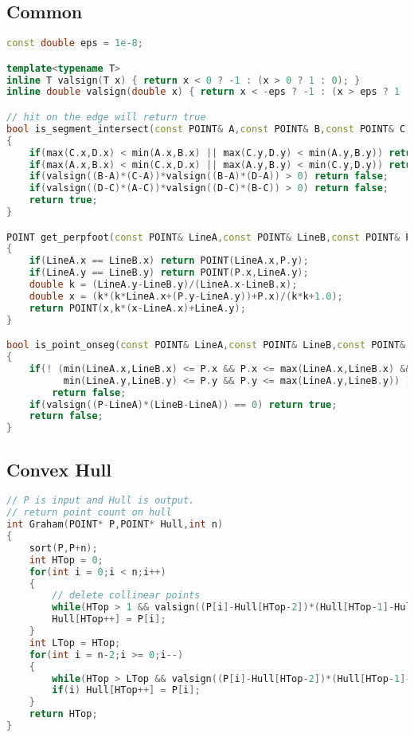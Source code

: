 \subsection{Common}
\begin{lstlisting}[language=C++]
const double eps = 1e-8;

template<typename T>
inline T valsign(T x) { return x < 0 ? -1 : (x > 0 ? 1 : 0); }
inline double valsign(double x) { return x < -eps ? -1 : (x > eps ? 1 : 0); }

// hit on the edge will return true
bool is_segment_intersect(const POINT& A,const POINT& B,const POINT& C,const POINT& D)
{
	if(max(C.x,D.x) < min(A.x,B.x) || max(C.y,D.y) < min(A.y,B.y)) return false;
	if(max(A.x,B.x) < min(C.x,D.x) || max(A.y,B.y) < min(C.y,D.y)) return false;
	if(valsign((B-A)*(C-A))*valsign((B-A)*(D-A)) > 0) return false;
	if(valsign((D-C)*(A-C))*valsign((D-C)*(B-C)) > 0) return false;
	return true;
}

POINT get_perpfoot(const POINT& LineA,const POINT& LineB,const POINT& P)
{
	if(LineA.x == LineB.x) return POINT(LineA.x,P.y);
	if(LineA.y == LineB.y) return POINT(P.x,LineA.y);
	double k = (LineA.y-LineB.y)/(LineA.x-LineB.x);
	double x = (k*(k*LineA.x+(P.y-LineA.y))+P.x)/(k*k+1.0);
	return POINT(x,k*(x-LineA.x)+LineA.y);
}

bool is_point_onseg(const POINT& LineA,const POINT& LineB,const POINT& P)
{
	if(! (min(LineA.x,LineB.x) <= P.x && P.x <= max(LineA.x,LineB.x) &&
		  min(LineA.y,LineB.y) <= P.y && P.y <= max(LineA.y,LineB.y)) )
		return false;
	if(valsign((P-LineA)*(LineB-LineA)) == 0) return true;
	return false;
}
\end{lstlisting}
\subsection{Convex Hull}
\begin{lstlisting}[language=C++]
// P is input and Hull is output.
// return point count on hull
int Graham(POINT* P,POINT* Hull,int n)
{
	sort(P,P+n);
	int HTop = 0;
	for(int i = 0;i < n;i++)
	{
		// delete collinear points
		while(HTop > 1 && valsign((P[i]-Hull[HTop-2])*(Hull[HTop-1]-Hull[HTop-2])) >= 0) HTop--;
		Hull[HTop++] = P[i];
	}
	int LTop = HTop;
	for(int i = n-2;i >= 0;i--)
	{
		while(HTop > LTop && valsign((P[i]-Hull[HTop-2])*(Hull[HTop-1]-Hull[HTop-2])) >= 0) HTop--;
		if(i) Hull[HTop++] = P[i];
	}
	return HTop;
}
\end{lstlisting}
